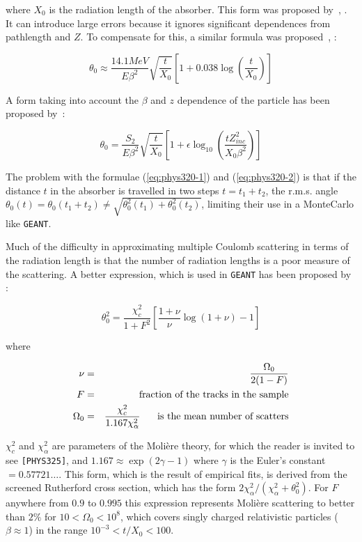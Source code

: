 where $X_0$ is the radiation length of the absorber. This form was
proposed by~\cite{bib-ROS1}, \cite{bib-ROS2}. It can
introduce large errors because it ignores significant dependences from
pathlength and $Z$. To compensate for this, a similar formula was
proposed~\cite{bib-HIG1}, \cite{bib-HIG2}:

\begin{equation}
\label{eq:phys320-1}
\theta_0 \approx \frac{14.1 MeV}{E \beta^2} \sqrt{\frac{t}{X_0}}
\left [ 1 + 0.038 \log \left( \frac{t}{X_0} \right ) \right ]
\end{equation}

A form taking into account the $\beta$ and $z$ dependence of
the particle has been proposed by~\cite{bib-LINC}:

\begin{equation}
\label{eq:phys320-2}
\theta_0 = \frac{S_{2}}{E \beta^2} \sqrt{\frac{t}{X_0}}
\left [ 1 + \epsilon \log_{10} \left( \frac{t Z_{inc}^2}{X_0 \beta^2} 
\right ) \right ]
\end{equation}

The problem with the formulae (\ref{eq:phys320-1}) and (\ref{eq:phys320-2})
is that if the distance $t$ in the absorber is travelled in two steps
$t = t_1 + t_2$, the r.m.s. angle $\theta_0(t) = \theta_0(t_1 +
t_2) \neq \sqrt{\theta_0^2(t_1) + \theta_0^2(t_2)}$, limiting their use
in a MonteCarlo like {\tt GEANT}.

Much of the difficulty in approximating multiple Coulomb scattering
in terms of the radiation length is that the number of radiation
lengths is a poor measure of the scattering. A better expression,
which is used in {\tt GEANT} has been proposed by \cite{bib-LINC}:

\begin{equation}
\theta_0^2 = \frac{\chi_c^2}{1+F^2} \left [
\frac{1+\nu}{\nu} \log( 1+\nu) -1 \right ]
\end{equation}

where

\begin{eqnarray*}
\nu & = & \frac{\Omega_0}{2 ( 1-F)} \\
F & = & \mbox{fraction of the tracks in the sample} \\
\Omega_0 & = & \frac{\chi_c^2}{1.167 \chi_{\alpha}^2} \mbox{\hspace{0.5cm}
is the mean number of scatters}
\end{eqnarray*}

$\chi_c^2$ and $\chi_{\alpha}^2$ are parameters of the Moli\`{e}re
theory, for which the reader is invited to see {\tt [PHYS325]},
and $1.167 \approx \exp(2\gamma -1)$ where $\gamma$ is the Euler's
constant $= 0.57721 \dots$. This form, which is the result of empirical
fits, is derived from the screened Rutherford cross section, which has
the form $2\chi_{\alpha}^2/(\chi_{\alpha}^2+\theta_0^2)$. For $F$ anywhere
from $0.9$ to $0.995$ this expression represents Moli\`{e}re scattering
to better than $2\%$ for $10 < \Omega_0 < 10^{8} $, which covers
singly charged relativistic particles ($\beta \approx 1$) in the
range $10^{-3} < t/X_0 < 100$.

